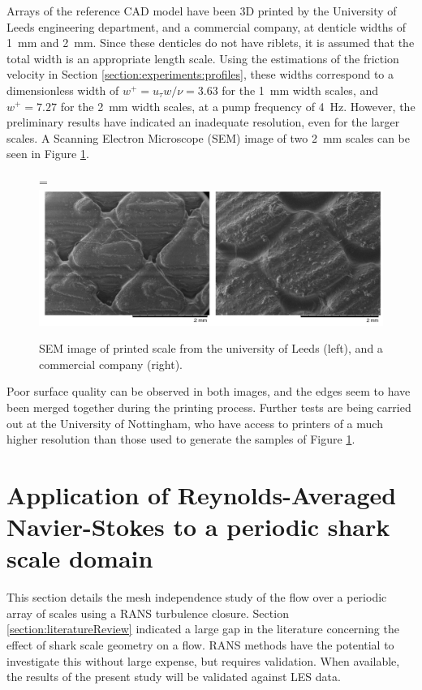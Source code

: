 \documentclass[12pt,oneside,a4paper]{article}
\newcommand*{\vcenteredhbox}[1]{\begingroup
\setbox0=\hbox{#1}\parbox{\wd0}{\box0}\endgroup}
\begin{document}
Arrays of the reference CAD model have been 3D printed by the University of Leeds engineering department, and a commercial company, at denticle widths of \SI{1}{mm} and \SI{2}{mm}. Since these denticles do not have riblets, it is assumed that the total width is an appropriate length scale. Using the estimations of the friction velocity in Section \ref{section:experiments:profiles}, these widths correspond to a dimensionless width of $w^+ = u_\tau w /\nu = 3.63$ for the \SI{1}{mm} width scales, and $w^+ = 7.27$ for the \SI{2}{mm} width scales, at a pump frequency of \SI{4}{Hz}. However, the preliminary results have indicated an inadequate resolution, even for the larger scales. A Scanning Electron Microscope (SEM) image of two \SI{2}{mm} scales can be seen in Figure \ref{figure:cad:printedSEM}. 
%
\begin{figure}
\centering
\vcenteredhbox{\includegraphics[width=\linewidth]{images/cad/printedSamples.png}}
\caption{SEM image of printed scale from the university of Leeds (left), and a commercial company (right).}
\label{figure:cad:printedSEM}
\end{figure}
%
Poor surface quality can be observed in both images, and the edges seem to have been merged together during the printing process. Further tests are being carried out at the University of Nottingham, who have access to printers of a much higher resolution than those used to generate the samples of Figure \ref{figure:cad:printedSEM}.

\newpage

\section{Application of Reynolds-Averaged Navier-Stokes to a periodic shark scale domain}
\label{section:rans}
This section details the mesh independence study of the flow over a periodic array of scales using a RANS turbulence closure. Section \ref{section:literatureReview} indicated a large gap in the literature concerning the effect of shark scale geometry on a flow. RANS methods have the potential to investigate this without large expense, but requires validation. When available, the results of the present study will be validated against LES data.
\end{document}
